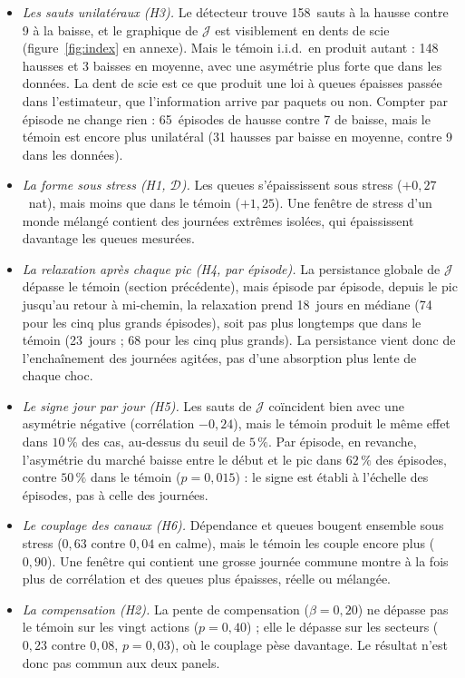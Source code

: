 \documentclass[11pt]{article}
\theoremstyle{definition}
\newcommand{\JJ}{\mathcal{J}}
\newcommand{\DD}{\mathcal{D}}
\begin{document}
\begin{itemize}
\item \emph{Les sauts unilatéraux (H3).} Le détecteur trouve 158~sauts à la
hausse contre 9 à la baisse, et le graphique de $\JJ$ est visiblement en dents
de scie (figure~\ref{fig:index} en annexe). Mais le témoin i.i.d.\ en produit
autant : 148 hausses et 3 baisses en moyenne, avec une asymétrie plus forte que
dans les données. La dent de scie est ce que produit une loi à queues épaisses
passée dans l'estimateur, que l'information arrive par paquets ou non.
Compter par épisode ne change rien : 65~épisodes de hausse contre 7 de
baisse, mais le témoin est encore plus unilatéral (31 hausses par baisse
en moyenne, contre 9 dans les données).
\item \emph{La forme sous stress (H1, $\DD$).} Les queues s'épaississent sous
stress ($+0{,}27$~nat), mais moins que dans le témoin ($+1{,}25$). Une
fenêtre \og de stress \fg{} d'un monde mélangé contient des journées extrêmes
isolées, qui épaississent davantage les queues mesurées.
\item \emph{La relaxation après chaque pic (H4, par épisode).} La persistance
globale de $\JJ$ dépasse le témoin (section précédente), mais épisode par
épisode, depuis le pic jusqu'au retour à mi-chemin, la relaxation prend
18~jours en médiane (74 pour les cinq plus grands épisodes), soit pas plus
longtemps que dans le témoin (23~jours ; 68 pour les cinq plus grands). La
persistance vient donc de l'enchaînement des journées agitées, pas d'une
absorption plus lente de chaque choc.
\item \emph{Le signe jour par jour (H5).} Les sauts de $\JJ$ coïncident bien
avec une asymétrie négative (corrélation $-0{,}24$), mais le témoin produit le
même effet dans $10\,\%$ des cas, au-dessus du seuil de $5\,\%$. Par
épisode, en revanche, l'asymétrie du marché baisse entre le début et le pic
dans $62\,\%$ des épisodes, contre $50\,\%$ dans le témoin ($p=0{,}015$) : le
signe est établi à l'échelle des épisodes, pas à celle des journées.
\item \emph{Le couplage des canaux (H6).} Dépendance et queues bougent
ensemble sous stress ($0{,}63$ contre $0{,}04$ en calme), mais le témoin les
couple encore plus ($0{,}90$). Une fenêtre qui contient une grosse journée
commune montre à la fois plus de corrélation et des queues plus épaisses,
réelle ou mélangée.
\item \emph{La compensation (H2).} La pente de compensation ($\beta=0{,}20$)
ne dépasse pas le témoin sur les vingt actions ($p=0{,}40$) ; elle le dépasse
sur les secteurs ($0{,}23$ contre $0{,}08$, $p=0{,}03$), où le couplage pèse
davantage. Le résultat n'est donc pas commun aux deux panels.
\end{itemize}
\end{document}
